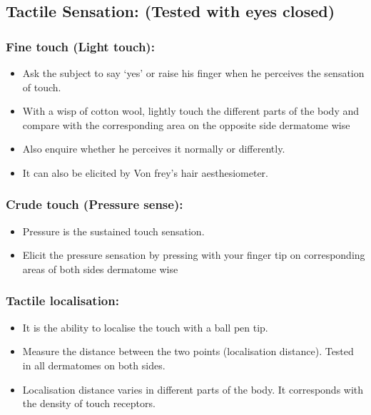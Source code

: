 \documentclass[a4paper,12pt,openany,oneside]{book}
\begin{document}
\subsection*{Tactile Sensation: (Tested with eyes closed)}
\subsubsection*{Fine touch (Light touch):}
\begin{itemize}
\item{ Ask the subject to say ‘yes’ or raise his finger when he perceives the sensation of touch.}
\item{ With a wisp of cotton wool, lightly touch the different parts of the body and compare with the corresponding area on the opposite side dermatome wise}
\item{ Also enquire whether he perceives it normally or differently.}
\item{ It can also be elicited by Von frey’s hair aesthesiometer.}
\end{itemize}

\subsubsection*{Crude touch (Pressure sense):}
\begin{itemize}
\item{Pressure is the sustained touch sensation.}
\item{Elicit the pressure sensation by pressing with your finger tip on 	corresponding areas of both sides dermatome wise}
\end{itemize}

\subsubsection*{Tactile localisation:}
\begin{itemize}
\item{It is the ability to localise the touch with a ball pen tip.}
\item{Measure the distance between the two points (localisation distance).  Tested in all dermatomes on both sides.}
\item{Localisation distance varies in different parts of the body. It corresponds with the density of touch receptors.}
\end{itemize}
\end{document}

